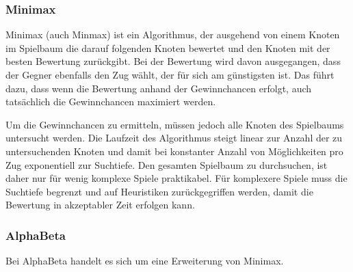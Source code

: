 
\subsubsection{Minimax}

Minimax (auch Minmax) ist ein Algorithmus, der ausgehend von einem Knoten im Spielbaum die darauf folgenden Knoten bewertet und den Knoten mit der besten Bewertung zurückgibt. Bei der Bewertung wird davon ausgegangen, dass der Gegner ebenfalls den Zug wählt, der für sich am günstigsten ist. Das führt dazu, dass wenn die Bewertung anhand der Gewinnchancen erfolgt, auch tatsächlich die Gewinnchancen maximiert werden.

Um die Gewinnchancen zu ermitteln, müssen jedoch alle Knoten des Spielbaums untersucht werden. Die Laufzeit des Algorithmus steigt linear zur Anzahl der zu untersuchenden Knoten und damit bei konstanter Anzahl von Möglichkeiten pro Zug exponentiell zur Suchtiefe. Den gesamten Spielbaum zu durchsuchen, ist daher nur für wenig komplexe Spiele praktikabel. Für komplexere Spiele muss die Suchtiefe begrenzt und auf Heuristiken zurückgegriffen werden, damit die Bewertung in akzeptabler Zeit erfolgen kann\cite{Ferguson.January2019}\cite{Heineman.October2008}.

\subsubsection{AlphaBeta}

Bei AlphaBeta handelt es sich um eine Erweiterung von Minimax.
